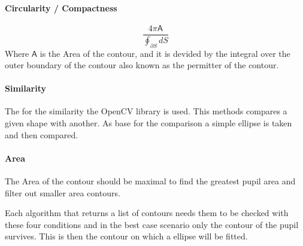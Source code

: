     \paragraph{Circularity / Compactness}
    \begin{equation}
        \frac{4\pi\mathsf{A} }{\oint_{\partial S} dS}
    \end{equation}
    Where $\mathsf{A} $ is the Area of the contour, and it is devided by the integral over the outer boundary of the contour also known as the permitter of the contour.

    \paragraph{Similarity }
    The for the similarity the OpenCV library is used. This methods compares a given shape with another. As base for the comparison a simple ellipse is taken and then compared.

    \paragraph{Area}
    The Area of the contour should be maximal to find the greatest pupil area and filter out smaller area contours. 

   Each algorithm that returns a list of contours needs them to be checked with these four conditions and in the best case scenario only the contour of the pupil survives. This is then the contour on which a ellipse will be fitted. 

   
